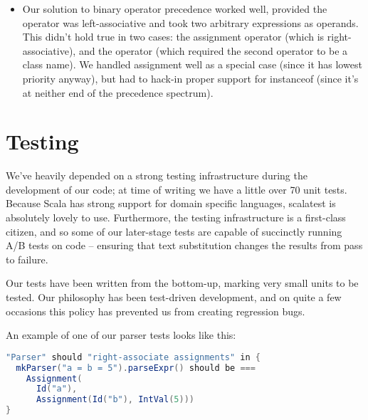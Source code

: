 \documentclass{article}
\begin{document}
\begin{itemize}
    \item Our solution to binary operator precedence worked well, provided the operator was left-associative and took two arbitrary expressions as operands. This didn't hold true in two cases: the assignment operator (which is right-associative), and the  operator (which required the second operator to be a class name). We handled assignment well as a special case (since it has lowest priority anyway), but had to hack-in proper support for instanceof (since it's at neither end of the precedence spectrum).
\end{itemize}




\section{Testing}

We've heavily depended on a strong testing infrastructure during the development of our code; at time of writing we have
a little over 70 unit tests. Because Scala has strong support for domain specific languages, scalatest is absolutely
lovely to use. Furthermore, the testing infrastructure is a first-class citizen, and so some of our later-stage tests
are capable of succinctly running A/B tests on code -- ensuring that text substitution changes the results from pass to
failure.

Our tests have been written from the bottom-up, marking very small units to be tested. Our philosophy has been
test-driven development, and on quite a few occasions this policy has prevented us from creating regression bugs.

An example of one of our parser tests looks like this:

\begin{lstlisting}[language=Scala]
"Parser" should "right-associate assignments" in {
  mkParser("a = b = 5").parseExpr() should be ===
    Assignment(
      Id("a"),
      Assignment(Id("b"), IntVal(5)))
}
\end{lstlisting}

\testsrc{*}
\end{document}
